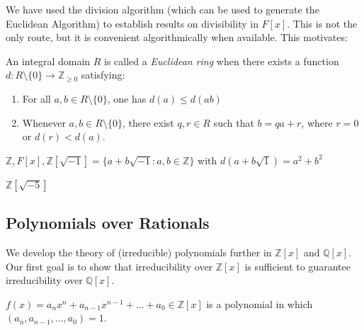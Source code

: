 We have used the division algorithm (which can be used to generate the Euclidean Algorithm) to establish results on divisibility in $F[x]$. This is not the only route, but it is convenient algorithmically when available. This motivates:

\begin{definition}
	An integral domain $R$ is called a \textit{Euclidean ring} when there exists a function $d: R\setminus \{0\} \to  \mathbb{Z}_{\ge 0}$ satisfying:
	\begin{enumerate}
		\item For all $a, b \in R \setminus \{0\} $, one has $d(a) \le  d(ab)$
		\item Whenever $a,b \in R \setminus  \{0\} $, there exist $q, r \in R$ such that $b = q a + r$, where $r = 0$ or $d(r) < d(a)$.
	\end{enumerate}
\end{definition}
\begin{example}
	$\mathbb{Z}, F[x], \mathbb{Z}[\sqrt{-1} ] = \{a + b\sqrt{-1} : a, b \in \mathbb{Z}\} $ with $d(a + b\sqrt{1}) = a^2 + b^2 $
\end{example}
\begin{nonexample}
	$\mathbb{Z} [\sqrt{-5} ] $
\end{nonexample}


\subsection{Polynomials over Rationals}

We develop the theory of (irreducible) polynomials further in $\mathbb{Z}[x]$ and $\mathbb{Q}[x]$. Our first goal is to show that irreducibility over $\mathbb{Z}[x]$ is sufficient to guarantee irreducibility over $\mathbb{Q}[x]$.
\begin{definition}
	$f(x) = a_n x^n + a_{n-1}x^{n-1} + \ldots + a_0 \in \mathbb{Z}[x]$ is a polynomial in which $(a_n, a_{n-1}, \ldots, a_0) = 1$.
\end{definition}

